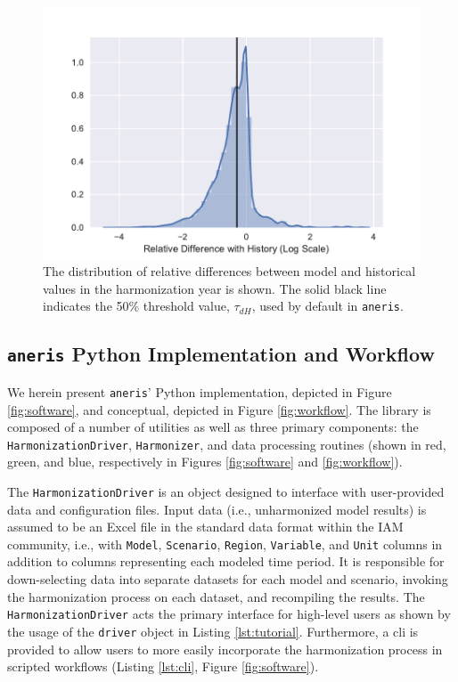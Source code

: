 \documentclass[review]{elsarticle}
\newcommand{\code}[1]{\lstinline[basicstyle=\ttfamily\color{black}]|#1|}
\begin{document}
\begin{figure}
  \begin{center}
    \includegraphics[width=\textwidth]{dh.pdf}
    \caption[]{
      \label{fig:dh}
      The distribution of relative differences between model and historical
      values in the harmonization year is shown. The solid black line indicates
      the 50\% threshold value, $\tau_{dH}$, used by default in \code{aneris}.
    }
  \end{center}
\end{figure}

\subsection{\code{aneris} Python Implementation and Workflow}\label{sec:workflow}

We herein present \code{aneris}' Python implementation, depicted in Figure
\ref{fig:software}, and conceptual, depicted in Figure \ref{fig:workflow}. The
library is composed of a number of utilities as well as three primary
components: the \texttt{HarmonizationDriver}, \texttt{Harmonizer}, and data
processing routines (shown in red, green, and blue, respectively in Figures
\ref{fig:software} and \ref{fig:workflow}).

The \texttt{HarmonizationDriver} is an object designed to interface with
user-provided data and configuration files. Input data (i.e., unharmonized model
results) is assumed to be an Excel file in the standard data format within the
IAM community, i.e., with \code{Model}, \code{Scenario}, \code{Region},
\code{Variable}, and \code{Unit} columns in addition to columns representing
each modeled time period. It is responsible for down-selecting data into
separate datasets for each model and scenario, invoking the harmonization
process on each dataset, and recompiling the results. The
\texttt{HarmonizationDriver} acts the primary interface for high-level users as
shown by the usage of the \texttt{driver} object in Listing
\ref{lst:tutorial}. Furthermore, a \gls{cli} is provided to allow users to more
easily incorporate the harmonization process in scripted workflows (Listing
\ref{lst:cli}, Figure \ref{fig:software}).
\end{document}
